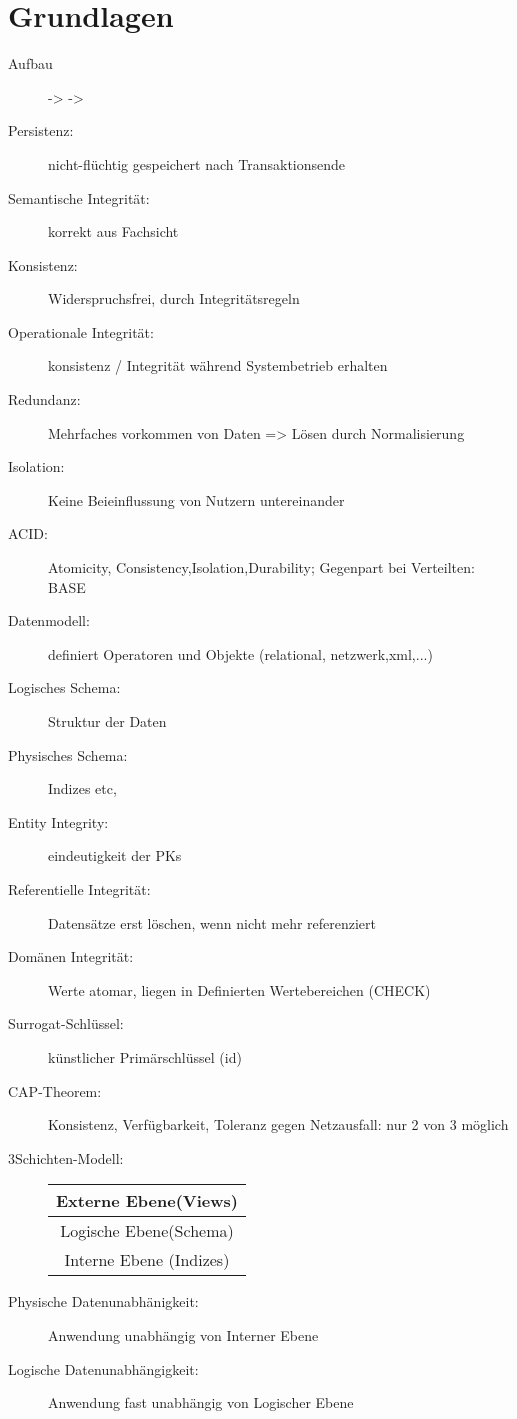 \section*{Grundlagen}

\begin{description}
\item[Aufbau]  ->  -> 
\item[Persistenz:] nicht-flüchtig gespeichert nach Transaktionsende
\item[Semantische Integrität:] korrekt aus Fachsicht 
\item[Konsistenz:] Widerspruchsfrei, durch Integritätsregeln
\item[Operationale Integrität:] konsistenz / Integrität während Systembetrieb erhalten
\item[Redundanz:] Mehrfaches vorkommen von Daten => Lösen durch Normalisierung
\item[Isolation:] Keine Beieinflussung von Nutzern untereinander
\item[ACID:] Atomicity, Consistency,Isolation,Durability; Gegenpart bei Verteilten: BASE
\item[Datenmodell:] definiert Operatoren und Objekte (relational, netzwerk,xml,...)
\item[Logisches Schema:] Struktur der Daten
\item[Physisches Schema:] Indizes etc,
\item[Entity Integrity:] eindeutigkeit der PKs
\item[Referentielle Integrität:] Datensätze erst löschen, wenn nicht mehr referenziert
\item[Domänen Integrität:] Werte atomar, liegen in Definierten Wertebereichen (CHECK)
\item[Surrogat-Schlüssel:] künstlicher Primärschlüssel (id)
\item[CAP-Theorem:] Konsistenz, Verfügbarkeit, Toleranz gegen Netzausfall: nur 2 von 3 möglich
\item[3Schichten-Modell:] \begin{minipage}{0.3\textwidth}
\begin{tabular}{|c|}
\hline
Externe Ebene(Views) \\\hline Logische Ebene(Schema) \\\hline Interne Ebene (Indizes)\\\hline
\end{tabular}\end{minipage}
\item[Physische Datenunabhänigkeit:] Anwendung unabhängig von Interner Ebene 
\item[Logische Datenunabhängigkeit:] Anwendung fast unabhängig von Logischer Ebene 
\end{description}



